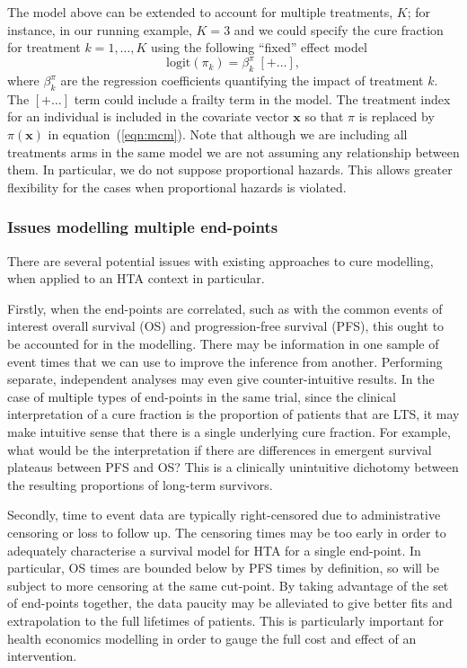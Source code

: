 \documentclass[AMA,STIX1COL]{WileyNJD-v2}
\begin{document}
The model above can be extended to account for multiple treatments, $K$; for instance, in our running example, $K=3$ and we could specify the cure fraction for treatment $k=1,\ldots,K$ using the following ``fixed'' effect model
\begin{equation}
\label{eqn:pi_regn}
\mbox{logit}(\pi_{k}) = \beta^{\pi}_{k} \; [+ \ldots],
\end{equation}
\noindent
where $\beta^{\pi}_k$ are the regression coefficients quantifying the impact of treatment $k$.
The $[+ \ldots]$ term could include a frailty term in the model.
The treatment index for an individual is included in the covariate vector $\bm{x}$ so that $\pi$ is replaced by $\pi(\bm{x})$ in equation~(\ref{eqn:mcm}).
Note that although we are including all treatments arms in the same model we are not assuming any relationship between them. In particular, we do not suppose proportional hazards. This allows greater flexibility for the cases when proportional hazards is violated.

\subsubsection{Issues modelling multiple end-points} \label{section:issues}
There are several potential issues with existing approaches to cure modelling, when applied to an HTA context in particular.

Firstly, when the end-points are correlated, such as with the common events of interest overall survival (OS) and progression-free survival (PFS), this ought to be accounted for in the modelling.
There may be information in one sample of event times that we can use to improve the inference from another.
Performing separate, independent analyses may even give counter-intuitive results.
In the case of multiple types of end-points in the same trial, since the clinical interpretation of a cure fraction is the proportion of patients that are LTS,
it may make intuitive sense that there is a single underlying cure fraction.
For example, what would be the interpretation if there are differences in emergent survival plateaus between PFS and OS?
This is a clinically unintuitive dichotomy between the resulting proportions of long-term survivors.

Secondly, time to event data are typically right-censored due to administrative censoring or loss to follow up.
The censoring times may be too early in order to adequately characterise a survival model for HTA for a single end-point.
In particular, OS times are bounded below by PFS times by definition, so will be subject to more censoring at the same cut-point.
By taking advantage of the set of end-points together, the data paucity may be alleviated to give better fits and extrapolation to the full lifetimes of patients.
This is particularly important for health economics modelling in order to gauge the full cost and effect of an intervention.
\end{document}
